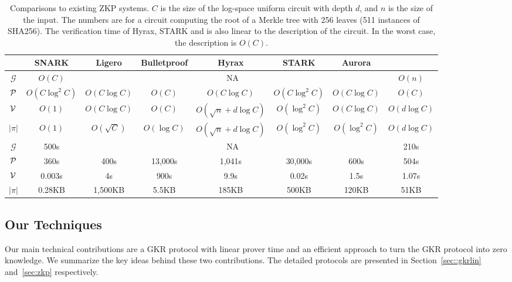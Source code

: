 \begin{table}[h]
	\centering
	{\fontsize{8}{8}
	\begin{tabular}{|c|c|c|c|c|c|c|c|}
		
		\hline
		&SNARK&Ligero&Bulletproof&Hyrax&STARK&Aurora&\name\\
		\hline
		\hline
		$\mathcal{G}$&$O(C)$&\multicolumn{5}{c|}{NA}&$O(n)$\\
		\hline
		$\P$&$O(C\log^2C)$&$O(C\log C)$&$O(C)$&$O(C\log C)$&$O(C\log^2 C)$&$O(C\log C)$ &$O(C)$\\
		\hline
		$\V$&$O(1)$&$O(C\log C)$&$O(C)$&$O(\sqrt{n}+d\log C)$&$O(\log^2 C)$&$O(C\log C)$&$O(d\log C)$\\
		\hline
		$|\pi|$&$O(1)$&$O(\sqrt{C})$&$O(\log C)$&$O(\sqrt{n}+d\log C)$&$O(\log^2 C)$& $O(\log^2 C)$&$O(d\log C)$\\
		\hline
		\hline
		$\mathcal{G}$&500s&\multicolumn{5}{c|}{NA}&210s\\
		\hline
		$\P$&360s&400s&13,000s&1,041s&30,000s&600s&504s\\
		\hline
			$\V$&0.003s&4s&900s&9.9s&0.02s&1.5s&1.07s\\
		\hline
		$|\pi|$&0.28KB&1,500KB&5.5KB&185KB&500KB&120KB&51KB\\
		\hline
	\end{tabular}
}

\caption{Comparisons to existing ZKP systems. $C$ is the size of the log-space uniform circuit with depth $d$, and $n$ is the size of the input. The numbers are for a circuit computing the root of a Merkle tree with 256 leaves (511 instances of SHA256). The verification time of Hyrax, STARK and \name is also linear to the description of the circuit. In the worst case, the description is $O(C)$.\protect\footnotemark}\label{tab:zkpall}

\end{table}

\subsection{Our Techniques}
Our main technical contributions are a GKR protocol with linear prover time and an efficient approach to turn the GKR protocol into zero knowledge. We summarize the key ideas behind these two contributions. The detailed protocols are presented in Section~\ref{sec::gkrlin} and~\ref{sec:zkp} respectively.

